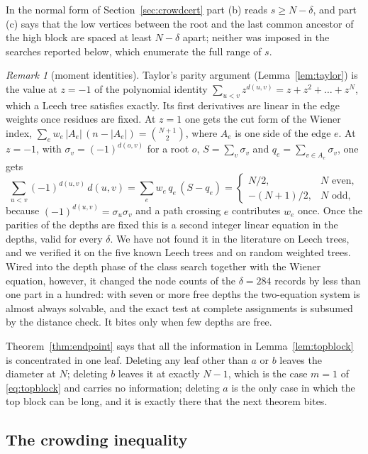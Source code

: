 \documentclass[11pt,a4paper]{article}
\theoremstyle{plain}
\theoremstyle{remark}
\newtheorem{remark}[theorem]{Remark}
\newcommand{\bin}[2]{\binom{#1}{#2}}
\begin{document}
In the normal form of Section~\ref{sec:crowdcert} part (b) reads
$s\ge N-\delta$, and part (c) says that the low vertices between the root and
the last common ancestor of the high block are spaced at least $N-\delta$
apart; neither was imposed in the searches reported below, which enumerate the
full range of $s$.

\begin{remark}[moment identities]\label{rem:moments}
Taylor's parity argument (Lemma~\ref{lem:taylor}) is the value at $z=-1$ of
the polynomial identity $\sum_{u<v}z^{d(u,v)}=z+z^2+\dots+z^N$, which a Leech
tree satisfies exactly.  Its first derivatives are linear in the edge weights
once residues are fixed.  At $z=1$ one gets the cut form of the Wiener index,
$\sum_e w_e\,|A_e|\,(n-|A_e|)=\bin{N+1}2$, where $A_e$ is one side of the edge
$e$.  At $z=-1$, with $\sigma_v=(-1)^{d(o,v)}$ for a root $o$, $S=\sum_v\sigma_v$
and $q_e=\sum_{v\in A_e}\sigma_v$, one gets
\[
  \sum_{u<v}(-1)^{d(u,v)}\,d(u,v)=\sum_e w_e\,q_e\,(S-q_e)
  =\begin{cases} N/2,& N \text{ even},\\ -(N+1)/2,& N \text{ odd},\end{cases}
\]
because $(-1)^{d(u,v)}=\sigma_u\sigma_v$ and a path crossing $e$ contributes
$w_e$ once.  Once the parities of the depths are fixed this is a second integer
linear equation in the depths, valid for every $\delta$.  We have not found it
in the literature on Leech trees, and we verified it on the five known Leech
trees and on random weighted trees.  Wired
into the depth phase of the class search together with the Wiener equation,
however, it changed the node counts of the $\delta=284$ records by less than
one part in a hundred: with seven or more free depths the two-equation system
is almost always solvable, and the exact test at complete assignments is
subsumed by the distance check.  It bites only when few depths are free.
\end{remark}

Theorem~\ref{thm:endpoint} says that all the information in
Lemma~\ref{lem:topblock} is concentrated in one leaf.  Deleting any leaf other
than $a$ or $b$ leaves the diameter at $N$; deleting $b$ leaves it at exactly
$N-1$, which is the case $m=1$ of \eqref{eq:topblock} and carries no
information; deleting $a$ is the only case in which the top block can be long,
and it is exactly there that the next theorem bites.

\subsection{The crowding inequality}\label{sec:crowdineq}
\end{document}
